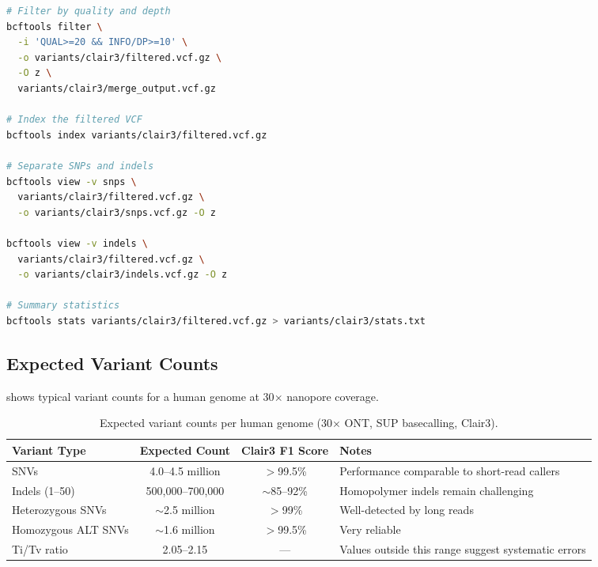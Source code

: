 \begin{lstlisting}[language=bash,caption={Filtering variants with bcftools.},label=lst:diy-bcftools]
# Filter by quality and depth
bcftools filter \
  -i 'QUAL>=20 && INFO/DP>=10' \
  -o variants/clair3/filtered.vcf.gz \
  -O z \
  variants/clair3/merge_output.vcf.gz

# Index the filtered VCF
bcftools index variants/clair3/filtered.vcf.gz

# Separate SNPs and indels
bcftools view -v snps \
  variants/clair3/filtered.vcf.gz \
  -o variants/clair3/snps.vcf.gz -O z

bcftools view -v indels \
  variants/clair3/filtered.vcf.gz \
  -o variants/clair3/indels.vcf.gz -O z

# Summary statistics
bcftools stats variants/clair3/filtered.vcf.gz > variants/clair3/stats.txt
\end{lstlisting}

\subsection{Expected Variant Counts}
\label{subsec:diyanalysis:expected_variants}

 shows typical variant counts for a human genome at 30$\times$ nanopore coverage.

\begin{table}[htbp]
\centering
\caption{Expected variant counts per human genome (30$\times$ ONT, SUP basecalling, Clair3).}
\label{tab:diy_variant_counts}
\begin{tabularx}{\textwidth}{@{}lccX@{}}
\toprule
\textbf{Variant Type} & \textbf{Expected Count} & \textbf{Clair3 F1 Score} & \textbf{Notes} \\
\midrule
SNVs & 4.0--4.5 million & $>$99.5\% & Performance comparable to short-read callers \\
Indels (1--50\basepair{}) & 500,000--700,000 & $\sim$85--92\% & Homopolymer indels remain challenging \\
Heterozygous SNVs & $\sim$2.5 million & $>$99\% & Well-detected by long reads \\
Homozygous ALT SNVs & $\sim$1.6 million & $>$99.5\% & Very reliable \\
Ti/Tv ratio & 2.05--2.15 & --- & Values outside this range suggest systematic errors \\
\bottomrule
\end{tabularx}
\end{table}

